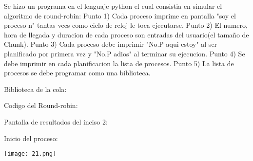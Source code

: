 \documentclass[12pt, a4paper]{report}
\begin{document}
\begin{center}
Se hizo un programa en el lenguaje python el cual consistia en simular el algoritmo de round-robin:
\medskip
Punto 1)
Cada proceso imprime en pantalla "soy el proceso n" tantas vecs como ciclo de reloj le toca ejecutarse.
\medskip
Punto 2)
El numero, hora de llegada y duracion de cada proceso son entradas del usuario(el tamaño de Chunk).
\medskip
Punto 3)
Cada proceso debe imprimir "No.P aqui estoy" al ser planificado por primera vez y "No.P adios" al terminar su ejecucion.
\medskip
Punto 4)
Se debe imprimir en cada planificacion la lista de procesos.
\medskip
Punto 5)
La lista de procesos se debe programar como una biblioteca.
\bigskip


\begin{flushleft}
Biblioteca de la cola:

\bigskip
\bigskip


\end{flushleft}

\bigskip
\bigskip

\end{center}
\begin{center}

\end{center}

\newpage

\begin{center}


\begin{flushleft}
Codigo del Round-robin:
\end{flushleft}
\bigskip
\bigskip
\begin{flushright}




\end{flushright}


\bigskip

\end{center}
\begin{center}

\bigskip

Pantalla de resultados del inciso 2:

\bigskip

Inicio del proceso:

\bigskip

\texttt{[image: 21.png]}

\bigskip

\end{center}
\end{document}
